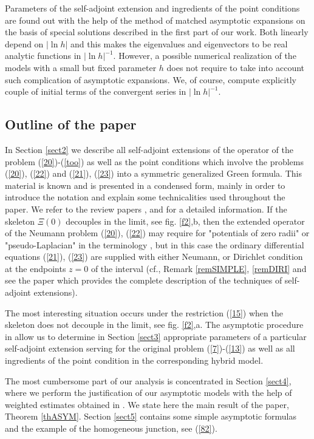 \documentclass[11pt]{article}%
\numberwithin{equation}{section}
\begin{document}
Parameters of the self-adjoint extension and ingredients of the point
conditions are found out with the help of the method of matched asymptotic
expansions on the basis of special solutions described in the first part
\cite{BuCaNa1} of our work. Both linearly depend on $|\ln h|$ and this makes
the eigenvalues and eigenvectors to be real analytic functions in $|\ln
h|^{-1}.$ However, a possible numerical realization of the models with a small
but fixed parameter $h$ does not require to take into account such
complication of asymptotic expansions. We, of course, compute explicitly
couple of initial terms of the convergent series in $|\ln h|^{-1}.$

\subsection{Outline of the paper\label{sect1.4}}

In Section \ref{sect2} we describe all self-adjoint extensions of the operator
of the problem (\ref{20})-(\ref{too}) as well as the point conditions which
involve the problems (\ref{20}), (\ref{22}) and (\ref{21}), (\ref{23}) into a
symmetric generalized Green formula. This material is known and is presented
in a condensed form, mainly in order to introduce the notation and explain
some technicalities used throughout the paper. We refer to the review papers
\cite{Pav}, \cite{Pank} and \cite{na345} for a detailed information. If the
skeleton $\Xi(0)$ decouples in the limit, see fig. \ref{f2},b, then the
extended operator of the Neumann problem (\ref{20}), (\ref{22}) may require
for "potentials of zero radii" \cite{BeFa, Pav} or "pseudo-Laplacian" in the
terminology \cite{Yves}, but in this case the ordinary differential equations
(\ref{21}), (\ref{23}) are supplied with either Neumann, or Dirichlet
condition at the endpoints $z=0$ of the interval (cf., Remark \ref{remSIMPLE},
\ref{remDIRI} and see the paper \cite{Pank} which provides the complete
description of the techniques of self-adjoint extensions).

The most interesting situation occurs under the restriction (\ref{15}) when
the skeleton does not decouple in the limit, see fig. \ref{f2},a. The
asymptotic procedure in \cite{BuCaNa1} allow us to determine in Section
\ref{sect3} appropriate parameters of a particular self-adjoint extension
serving for the original problem (\ref{7})-(\ref{13}) as well as all
ingredients of the point condition in the corresponding hybrid model.

The most cumbersome part of our analysis is concentrated in Section
\ref{sect4}, where we perform the justification of our asymptotic models with
the help of weighted estimates obtained in \cite{BuCaNa1}. We state here the
main result of the paper, Theorem \ref{thASYM}. Section \ref{sect5} contains
some simple asymptotic formulas and the example of the homogeneous junction,
see (\ref{82}).
\end{document}
